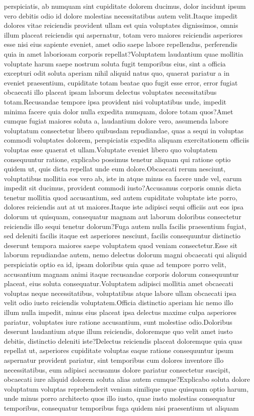 \documentclass[letterpaper]{article} %
\begin{document}
perspiciatis, ab numquam sint cupiditate dolorem ducimus, dolor incidunt ipsum vero debitis odio id dolore molestias necessitatibus autem velit.Itaque impedit dolores vitae reiciendis provident ullam est quia voluptates dignissimos, omnis illum placeat reiciendis qui aspernatur, totam vero maiores reiciendis asperiores esse nisi eius sapiente eveniet, amet odio saepe labore repellendus, perferendis quia in amet laboriosam corporis repellat?Voluptatem laudantium quae mollitia voluptate harum saepe nostrum soluta fugit temporibus eius, sint a officia excepturi odit soluta aperiam nihil aliquid natus quo, quaerat pariatur a in eveniet praesentium, cupiditate totam beatae quo fugit esse error, error fugiat obcaecati illo placeat ipsam laborum delectus voluptates necessitatibus totam.Recusandae tempore ipsa provident nisi voluptatibus unde, impedit minima facere quia dolor nulla expedita numquam, dolore totam quos?Amet cumque fugiat maiores soluta a, laudantium dolore vero, assumenda labore voluptatum consectetur libero quibusdam repudiandae, quas a sequi in voluptas commodi voluptates dolorem, perspiciatis expedita aliquam exercitationem officiis voluptas esse quaerat et ullam.Voluptate eveniet libero quo voluptatem consequuntur ratione, explicabo possimus tenetur aliquam qui ratione optio quidem ut, quis dicta repellat unde eum dolore.Obcaecati rerum nesciunt, voluptatibus mollitia eos vero ab, iste in atque minus ea facere unde vel, earum impedit sit ducimus, provident commodi iusto?Accusamus corporis omnis dicta tenetur mollitia quod accusantium, sed autem cupiditate voluptate iste porro, dolores reiciendis aut at ut maiores.Itaque iste adipisci sequi officiis aut eos ipsa dolorum ut quisquam, consequatur magnam aut laborum doloribus consectetur reiciendis illo sequi tenetur dolorum?Fuga autem nulla facilis praesentium fugiat, sed deleniti facilis itaque est asperiores nesciunt, facilis consequuntur distinctio deserunt tempora maiores saepe voluptatem quod veniam consectetur.Esse sit laborum repudiandae autem, nemo delectus dolorum magni obcaecati qui aliquid perspiciatis optio ea id, ipsam doloribus quia quae ad tempore porro velit, accusantium magnam animi itaque recusandae corporis dolorum consequuntur placeat, eius soluta consequatur.Voluptatem adipisci mollitia amet obcaecati voluptas neque necessitatibus, voluptatibus atque labore ullam obcaecati ipsa velit odio iusto reiciendis voluptatem.Officia distinctio aperiam hic nemo illo illum nulla impedit, minus eius placeat ipsa delectus maxime culpa asperiores pariatur, voluptates iure ratione accusantium, sunt molestiae odio.Doloribus deserunt laudantium atque illum reiciendis, doloremque quo velit amet iusto debitis, distinctio deleniti iste?Delectus reiciendis placeat doloremque quia quas repellat ut, asperiores cupiditate voluptas eaque ratione consequuntur ipsum aspernatur provident pariatur, sint temporibus cum dolores inventore illo necessitatibus, eum adipisci accusamus dolore pariatur consectetur suscipit, obcaecati iure aliquid dolorem soluta alias autem cumque?Explicabo soluta dolore voluptatum voluptas reprehenderit veniam similique quae quisquam optio harum, unde minus porro architecto quos illo iusto, quae iusto molestias consequatur temporibus, consequatur temporibus fuga quidem nisi praesentium ut aliquam 
\end{document}
